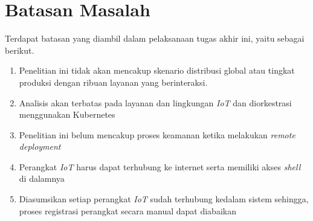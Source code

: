 \section{Batasan Masalah}
\label{sec:batasan-masalah}

Terdapat batasan yang diambil dalam pelaksanaan tugas akhir ini, yaitu sebagai berikut.

\begin{enumerate}
  \item Penelitian ini tidak akan mencakup skenario distribusi global atau tingkat produksi dengan ribuan layanan yang berinteraksi.
  \item Analisis akan terbatas pada layanan dan lingkungan \textit{IoT} dan diorkestrasi menggunakan Kubernetes
  \item Penelitian ini belum mencakup proses keamanan ketika melakukan \textit{remote deployment}
  \item Perangkat \textit{IoT} harus dapat terhubung ke internet serta memiliki akses \textit{shell} di dalamnya
  \item Diasumsikan setiap perangkat \textit{IoT} sudah terhubung kedalam sistem sehingga, proses registrasi perangkat secara manual dapat diabaikan
\end{enumerate}

